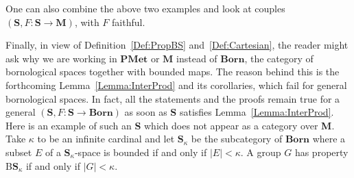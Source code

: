 \documentclass[a4paper]{article}
\newtheorem{prop}[lem]{Proposition}
\theoremstyle{definition}
\newtheorem{rem}[lem]{Remark}
\newcommand*{\category}[1]{\textbf{#1}}
\newcommand*{\PMet}{\category{PMet}}
\newcommand*{\CatS}{\category{S}}
\newcommand*{\BS}{B\textbf{S}}
\begin{document}
One can also combine the above two examples and look at couples $(\CatS,F\colon\CatS\to \category{M})$, with $F$ faithful.

Finally, in view of Definition~\ref{Def:PropBS} and~\ref{Def:Cartesian}, the reader might ask why we are working in $\PMet$ or $\category{M}$ instead of $\category{Born}$, the category of bornological spaces together with bounded maps.
The reason behind this is the forthcoming Lemma~\ref{Lemma:InterProd} and its corollaries, which fail for general bornological spaces.
In fact, all the statements and the proofs remain true for a general $(\CatS,F\colon\CatS\to \category{Born})$ as soon as \CatS{} satisfies Lemma~\ref{Lemma:InterProd}.
Here is an example of such an \CatS{} which does not appear as a category over \category{M}.
Take $\kappa$ to be an infinite cardinal and let $\mathbf{S}_\kappa$ be the subcategory of $\category{Born}$ where a subset $E$ of a $\mathbf{S}_\kappa$-space is bounded if and only if $\lvert E\rvert<\kappa$.
A group $G$ has property B$\mathbf{S}_\kappa$ if and only if $\lvert G\rvert<\kappa$.
%
%
%
%
\end{document}
